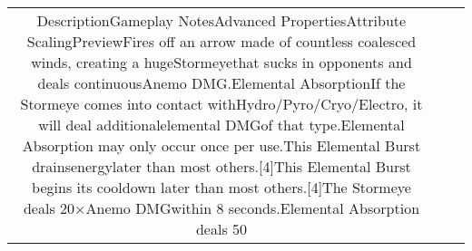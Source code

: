 \documentclass[a4paper,12pt]{article}
\begin{document}
\begin{tabular}{|c|c|c|}
DescriptionGameplay NotesAdvanced PropertiesAttribute ScalingPreviewFires off an arrow made of countless coalesced winds, creating a hugeStormeyethat sucks in opponents and deals continuousAnemo DMG.Elemental AbsorptionIf the Stormeye comes into contact withHydro/Pyro/Cryo/Electro, it will deal additionalelemental DMGof that type.Elemental Absorption may only occur once per use.This Elemental Burst drainsenergylater than most others.[4]This Elemental Burst begins its cooldown later than most others.[4]The Stormeye deals 20×Anemo DMGwithin 8 seconds.Elemental Absorption deals 50%
\end{tabular}
\end{document}
